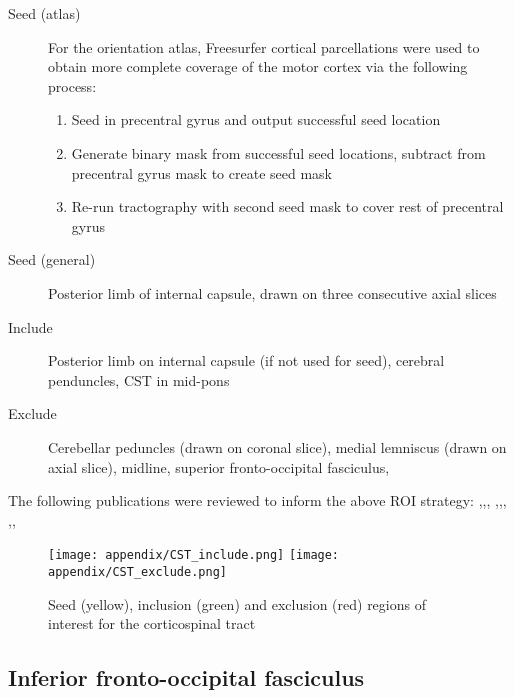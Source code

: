 \begin{description}
  \item[Seed (atlas)] For the orientation atlas, Freesurfer cortical parcellations were used to obtain more complete coverage of the motor cortex via the following process:
  \begin{enumerate}
    \item Seed in precentral gyrus and output successful seed location
    \item Generate binary mask from successful seed locations, subtract from precentral gyrus mask to create seed mask
    \item Re-run tractography with second seed mask to cover rest of precentral gyrus
  \end{enumerate}
  \item[Seed (general)] Posterior limb of internal capsule, drawn on three consecutive axial slices
  \item[Include] Posterior limb on internal capsule (if not used for seed), cerebral penduncles, CST in mid-pons
  \item[Exclude] Cerebellar peduncles (drawn on coronal slice), medial lemniscus (drawn on axial slice), midline, superior fronto-occipital fasciculus,
\end{description}

The following publications were reviewed to inform the above ROI strategy: \textcite{Ciccarelli2006},\textcite{Han2010},\textcite{Hattingen2009a},
\textcite{Niu2016},\textcite{Radmanesh2015},\textcite{Reich2006},
\textcite{Rosenstock2017},\textcite{Szmuda2021},\textcite{Vargas2013}

\begin{figure*}[h]
  \centering
    \texttt{[image: appendix/CST\_include.png]}
    \texttt{[image: appendix/CST\_exclude.png]}
  \caption{Seed (yellow), inclusion (green) and exclusion (red) regions of interest for the corticospinal tract}
  \label{fig:rois.cst}
\end{figure*}

\subsection{Inferior fronto-occipital fasciculus}

